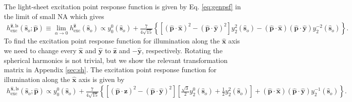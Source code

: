 \documentclass[11pt]{article}
\providecommand{\so}[1]{\mathbf{\hat{s}}_o}
\providecommand{\mh}[1]{\mathbf{\hat{#1}}}
\begin{document}

The light-sheet excitation point response function is given by Eq.
\ref{eq:genpsf} in the limit of small NA which gives
\begin{align}
  h^{\mh{z}, \text{ls}}_{\text{exc}}(\so{}; \mh{p}) \equiv \lim_{\alpha \rightarrow 0} h^{\mh{z}}_{\text{exc}}(\so{}) \propto y_0^0(\so{}) + \frac{7}{4\sqrt{15}}\left\{[(\mh{p}\cdot\mh{x})^2 - (\mh{p}\cdot\mh{y})^2]y_2^2(\so{}) - (\mh{p}\cdot\mh{x})(\mh{p}\cdot\mh{y})y_2^{-2}(\so{})\right\}.
\end{align}
To find the excitation point response function for illumination along the
$\mh{x}$ axis we need to change every $\mh{x}$ and $\mh{y}$ to $\mh{z}$ and
$-\mh{y}$, respectively. Rotating the spherical harmonics is not trivial,
but we show the relevant transformation matrix in Appendix \ref{sec:sh}. The
excitation point response function for illumination along the $\mh{x}$ axis is
given by
\begin{align}
  h^{\mh{x}, \text{ls}}_{\text{exc}}(\so{}; \mh{p}) \propto y_0^0(\so{}) + \frac{7}{4\sqrt{15}}\left\{[(\mh{p}\cdot\mh{z})^2 - (\mh{p}\cdot\mh{y})^2]\left[\frac{\sqrt{3}}{2}y_2^0(\so{}) + \frac{1}{2}y_2^2(\so{})\right] + (\mh{p}\cdot\mh{x})(\mh{p}\cdot\mh{y})y_2^{-1}(\so{})\right\}.
\end{align}
\end{document}
